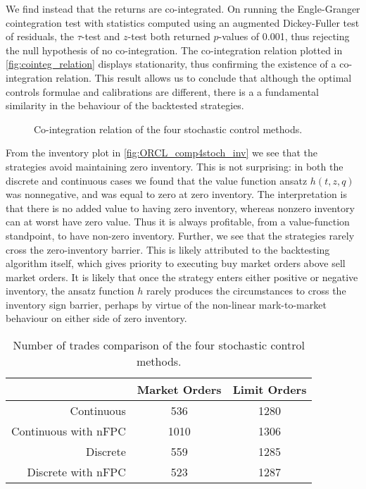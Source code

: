 We find instead that the returns are co-integrated. On running the Engle-Granger cointegration test with statistics computed using an augmented Dickey-Fuller test of residuals, the $\tau$-test and $z$-test both returned $p$-values of 0.001, thus rejecting the null hypothesis of no co-integration. The co-integration relation plotted in \autoref{fig:cointeg_relation} displays stationarity, thus confirming the existence of a co-integration relation. This result allows us to conclude that although the optimal controls formulae and calibrations are different, there is a a fundamental similarity in the behaviour of the backtested strategies.

\begin{figure}[H]
  \centering
  \setlength{} 
  \setlength{}
  
  \caption[Co-integration relation of the four stochastic control methods]{Co-integration relation of the four stochastic control methods.}
  \label{fig:cointeg_relation}
\end{figure}
From the inventory plot in \autoref{fig:ORCL_comp4stoch_inv} we see that the strategies avoid maintaining zero inventory. This is not surprising: in both the discrete and continuous cases we found that the value function ansatz $h(t,z,q)$ was nonnegative, and was equal to zero at zero inventory. The interpretation is that there is no added value to having zero inventory, whereas nonzero inventory can at worst have zero value. Thus it is always profitable, from a value-function standpoint, to have non-zero inventory. Further, we see that the strategies rarely cross the zero-inventory barrier. This is likely attributed to the backtesting algorithm itself, which gives priority to executing buy market orders above sell market orders. It is likely that once the strategy enters either positive or negative inventory, the ansatz function $h$ rarely produces the circumstances to cross the inventory sign barrier, perhaps by virtue of the non-linear mark-to-market behaviour on either side of zero inventory.

\begin{table}[htb]
\centering
{}
\caption[Number of trades comparison of the four stochastic control methods]{Number of trades comparison of the four stochastic control methods.}\label{tbl:ORCL_comp4stoch_numt}
\begin{tabular}{@{} r *{2}{c} @{}}
\toprule
& Market Orders & Limit Orders \\
\midrule
Continuous          &  536 & 1280 \\
Continuous with nFPC   & 1010 & 1306 \\
Discrete         &  559 & 1285 \\
Discrete with nFPC  &  523 & 1287 \\
\bottomrule
\end{tabular}
\end{table}


